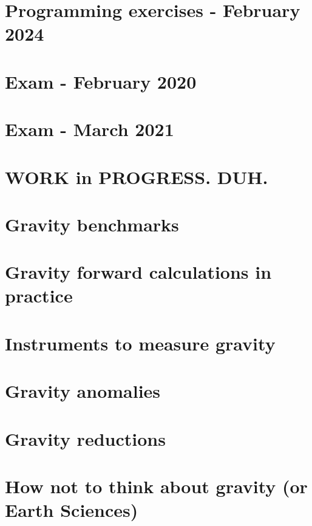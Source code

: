 \section{Programming exercises - February 2024 \label{exgravptmass}} 

\newpage
\section{Exam - February 2020} 
\newpage
\section{Exam - March 2021} 

\newpage
\section{WORK in PROGRESS. DUH.} %

\section{Gravity benchmarks} 

\newpage
\section{Gravity forward calculations in practice} 
\section{Instruments to measure gravity} 
\section{Gravity anomalies} 
\section{Gravity reductions} 
\section{How not to think about gravity (or Earth Sciences)} 
